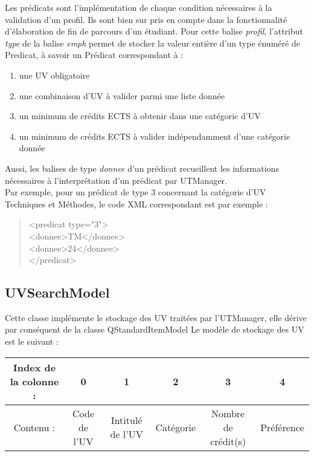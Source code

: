 \documentclass[a4paper,10pt,french]{report}
\begin{document}
	Les prédicats sont l'implémentation de chaque condition nécessaires à la validation d'un profil.
	Ils sont bien sur pris en compte dans la fonctionnalité d'élaboration de fin de parcours d'un étudiant.	
	Pour cette balise \emph{profil}, l'attribut \emph{type} de la balise \emph{emph} permet de stocker la valeur entière d'un type énuméré de Predicat, à savoir un Prédicat correspondant à :
	\begin{enumerate}
	\item une UV obligatoire
	\item une combinaison d'UV à valider parmi une liste donnée
	\item un minimum de crédits ECTS à obtenir dans une catégorie d'UV
	\item un minimum de crédits ECTS à valider indépendamment d'une catégorie donnée
	\end{enumerate}
	Aussi, les balises de type \emph{donnee} d'un prédicat recueillent les informations nécessaires à l'interprétation d'un prédicat par UTManager.\\
	Par exemple, pour un prédicat de type 3 concernant la catégorie d'UV Techniques et Méthodes, le code XML correspondant est par exemple :
	\begin{quote}
<predicat type="3">\\
		\hspace*{1cm}<donnee>TM</donnee>\\
		\hspace*{1cm}<donnee>24</donnee>\\
</predicat>\\
	\end{quote}
	
	
	
	\subsection{UVSearchModel}\label{subsec:UVSearchModel}
	
	Cette classe %
     implémente le stockage des UV traitées par l'UTManager, elle dérive par conséquent de la classe QStandardItemModel
	Le modèle de stockage des UV est le suivant :
	
	\begin{tabular}{|c||c|c|c|c|c|}
	\hline
	Index de la colonne :  & 0 & 1 & 2 & 3 & 4 \\ \hline
	Contenu : & Code de l'UV & Intitulé de l'UV & Catégorie & Nombre de crédit(s) & Préférence \\
	\hline
	\end{tabular}
	
\end{document}
